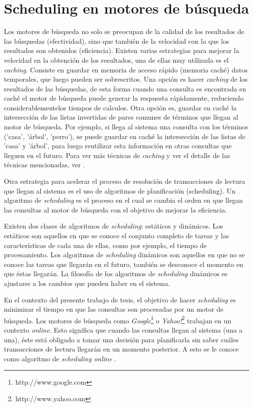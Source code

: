 \section{Scheduling en motores de búsqueda}
\label{marco:scheduling}
Los motores de búsqueda no solo se preocupan de la calidad de los resultados de las búsquedas (efectividad), sino que también de la velocidad con la que los resultados son obtenidos (eficiencia). Existen varias estrategias para mejorar la velocidad en la obtención de los resultados, una de ellas muy utilizada es el \textit{caching}. Consiste en guardar en memoria de acceso rápido (memoria caché) datos temporales, que luego pueden ser sobrescritos. Una opción es hacer \textit{caching} de los resultados de las búsquedas, de esta forma cuando una consulta es encontrada en caché el motor de búsqueda puede generar la respuesta rápidamente, reduciendo considerablementelos tiempos de calculos. Otra opción es, guardar en caché la intersección de las listas invertidas de pares comunes de términos que llegan al motor de búsqueda. Por ejemplo, si llega al sistema una consulta con los términos ('casa', 'árbol', 'perro'), se puede guardar en caché la intersección de las listas de 'casa' y 'árbol', para luego reutilizar esta información en otras consultas que lleguen en el futuro. Para ver más técnicas de \textit{caching} y ver el detalle de las técnicas mencionadas, ver \citep{Buttcher:2010}. 

Otra estrategia para acelerar el proceso de resolución de transacciones de lectura que llegan al sistema es el uso de algoritmos de planificación (scheduling). Un algoritmo de \textit{scheduling} es el proceso en el cual se cambia el orden en que llegan las consultas al motor de búsqueda con el objetivo de mejorar la eficiencia. 

Existen dos clases de algoritmos de \textit{scheduling}: estáticos y dinámicos. Los estáticos son aquellos en que se conoce el conjunto completo de tareas y las características de cada una de ellas, como por ejemplo, el tiempo de procesamiento. Los algoritmos de \textit{scheduling} dinámicos son aquellos en que no se conoce las tareas que llegarán en el futuro, también se desconoce el momento en que éstas llegarán. La filosofía de los algoritmos de \textit{scheduling} dinámicos es ajustarse a los cambios que pueden haber en el sistema.

En el contexto del presente trabajo de tesis, el objetivo de hacer \textit{scheduling} es minimizar el tiempo en que las consultas son procesadas por un motor de búsqueda. Los motores de búsqueda como \textit{Google}\footnote{http://www.google.com} o \textit{Yahoo!}\footnote{http://www.yahoo.com} trabajan en un contexto \textit{online}. Esto significa que cuando las consultas llegan al sistema (una a una), éste está obligado a tomar una decisión para planificarla sin saber cuáles transacciones de lectura llegarán en un momento posterior. A esto se le conoce como algoritmo de \textit{scheduling online} \citep{Albers:2003, Borodin:1998}.

